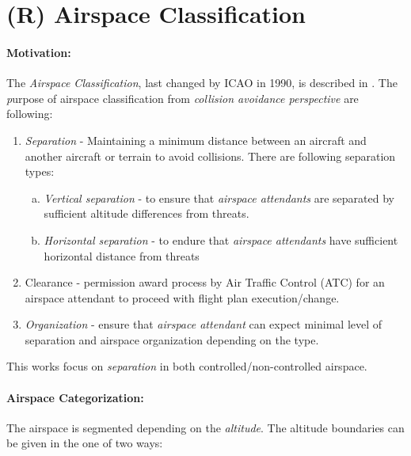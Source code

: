 \newpage
\section{(R) Airspace Classification}\label{sec:AirspaceClassification}
\paragraph{Motivation:} The \emph{Airspace Classification}, last changed by ICAO in 1990, is described in \cite{icaoAnnex11}. The \emph purpose of airspace classification from \emph{collision avoidance perspective} are following:

\begin{enumerate}
    \item \emph{Separation} - Maintaining a minimum distance between an aircraft and another aircraft or terrain to avoid collisions. There are following separation types:
    \begin{enumerate}[a.]
        \item \emph{Vertical separation} - to ensure that \emph{airspace attendants} are separated by sufficient altitude differences from threats.
        
        \item \emph{Horizontal  separation} - to endure that \emph{airspace attendants} have sufficient horizontal distance from threats
    \end{enumerate}
    
    \item{Clearance} - permission award process by Air Traffic Control (ATC) for an airspace attendant to proceed with flight plan execution/change.
    
    \item \emph{Organization} - ensure that \emph{airspace attendant} can expect minimal level of separation and airspace organization depending on the type.
\end{enumerate}

\begin{note}
    This works focus on \emph{separation} in both controlled/non-controlled airspace.
\end{note}

\paragraph{Airspace Categorization:} The airspace is segmented depending on the \emph{altitude}. The altitude boundaries can be given in the one of two ways:

